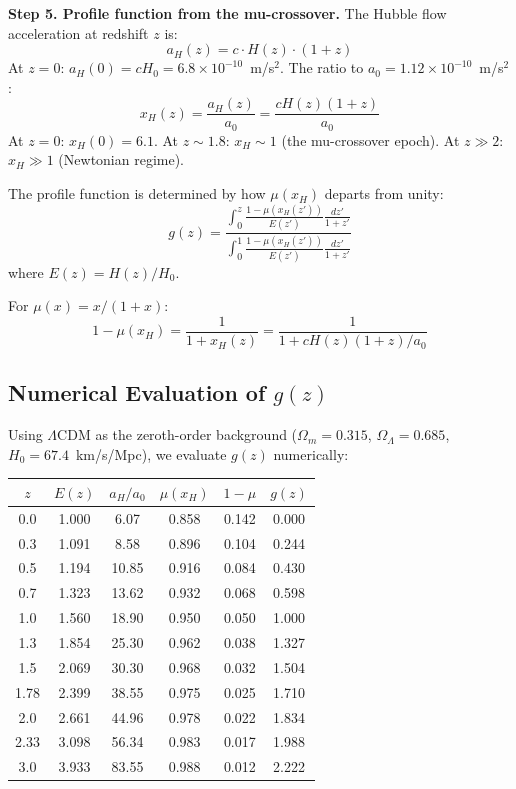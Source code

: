 \documentclass[11pt,a4paper]{article}
\newcommand{\LCDM}{$\Lambda$CDM}
\begin{document}
\begin{tcolorbox}[colback=blue!3!white, colframe=blue!60!black,
  title=\textbf{Finding \thesection: The Exact Modified $H(z)$
  Equation}\label{find:background}]
\textbf{Step 5. Profile function from the mu-crossover.} The Hubble
flow acceleration at redshift $z$ is:
\begin{equation}
a_H(z) = c \cdot H(z) \cdot (1+z)
\end{equation}
At $z = 0$: $a_H(0) = cH_0 = 6.8 \times 10^{-10}$~m/s$^2$.
The ratio to $a_0 = 1.12 \times 10^{-10}$~m/s$^2$:
\begin{equation}
x_H(z) = \frac{a_H(z)}{a_0} = \frac{cH(z)(1+z)}{a_0}
\end{equation}
At $z = 0$: $x_H(0) = 6.1$. At $z \sim 1.8$: $x_H \sim 1$
(the mu-crossover epoch). At $z \gg 2$: $x_H \gg 1$ (Newtonian regime).

The profile function is determined by how $\mu(x_H)$ departs from
unity:
\begin{equation}
g(z) = \frac{\int_0^z \frac{1-\mu(x_H(z'))}{E(z')} \frac{dz'}{1+z'}}
{\int_0^1 \frac{1-\mu(x_H(z'))}{E(z')} \frac{dz'}{1+z'}}
\label{eq:g_profile}
\end{equation}
where $E(z) = H(z)/H_0$.

For $\mu(x) = x/(1+x)$:
\begin{equation}
1 - \mu(x_H) = \frac{1}{1 + x_H(z)} = \frac{1}{1 + cH(z)(1+z)/a_0}
\end{equation}

\end{tcolorbox}

\subsection{Numerical Evaluation of $g(z)$}

Using \LCDM{} as the zeroth-order background ($\Omega_m = 0.315$,
$\Omega_\Lambda = 0.685$, $H_0 = 67.4$~km/s/Mpc), we evaluate
$g(z)$ numerically:

\begin{center}
\begin{tabular}{cccccc}
\toprule
$z$ & $E(z)$ & $a_H/a_0$ & $\mu(x_H)$ & $1-\mu$ & $g(z)$ \\
\midrule
0.0 & 1.000 & 6.07 & 0.858 & 0.142 & 0.000 \\
0.3 & 1.091 & 8.58 & 0.896 & 0.104 & 0.244 \\
0.5 & 1.194 & 10.85 & 0.916 & 0.084 & 0.430 \\
0.7 & 1.323 & 13.62 & 0.932 & 0.068 & 0.598 \\
1.0 & 1.560 & 18.90 & 0.950 & 0.050 & 1.000 \\
1.3 & 1.854 & 25.30 & 0.962 & 0.038 & 1.327 \\
1.5 & 2.069 & 30.30 & 0.968 & 0.032 & 1.504 \\
1.78 & 2.399 & 38.55 & 0.975 & 0.025 & 1.710 \\
2.0 & 2.661 & 44.96 & 0.978 & 0.022 & 1.834 \\
2.33 & 3.098 & 56.34 & 0.983 & 0.017 & 1.988 \\
3.0 & 3.933 & 83.55 & 0.988 & 0.012 & 2.222 \\
\bottomrule
\end{tabular}
\end{center}
\end{document}
